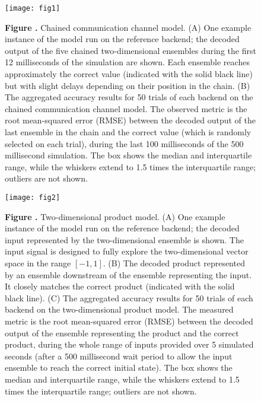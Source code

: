 \documentclass{frontiersSCNS}
\begin{document}
\begin{figure}[!ht]
\begin{center}
  \texttt{[image: fig1]}
\end{center}
\textbf{\label{fig:01} Figure .}
       {Chained communication channel model. (A) One example instance
         of the model run on the reference backend; the decoded output
         of the five chained two-dimensional ensembles during the first
         12 milliseconds of the simulation are shown.
         Each ensemble reaches approximately the correct value
         (indicated with the solid black line)
         but with slight delays depending on their position in the chain.
         (B) The aggregated accuracy results for
         50 trials of each backend on the
         chained communication channel model. The observed metric is the root
         mean-squared error (RMSE) between the decoded output of the last
         ensemble in the chain and the correct value (which is randomly
         selected on each trial), during the last 100 milliseconds of the
         500 millisecond simulation. The box shows the median and
         interquartile range, while the whiskers extend to 1.5 times the
         interquartile range; outliers are not shown.}
\end{figure}

\begin{figure}[!ht]
\begin{center}
  \texttt{[image: fig2]}
\end{center}
\textbf{\label{fig:02} Figure .}
       {Two-dimensional product model. (A) One example instance of the model
         run on the reference backend; the decoded input represented
         by the two-dimensional ensemble is shown. The input signal is
         designed to fully explore the two-dimensional vector space
         in the range $[-1, 1]$.
         (B) The decoded product represented by an ensemble downstream
         of the ensemble representing the input. It closely matches the
         correct product (indicated with the solid black line).
         (C) The aggregated accuracy results for 50 trials of
         each backend on the
         two-dimensional product model. The measured metric is the root
         mean-squared error (RMSE) between the decoded output of the ensemble
         representing the product and the correct product, during the whole
         range of inputs provided over 5 simulated seconds (after a 500
         millisecond wait period to allow the input ensemble to reach the
         correct initial state). The box shows the median and
         interquartile range, while the whiskers extend to 1.5 times the
         interquartile range; outliers are not shown.}
\end{figure}
\end{document}
